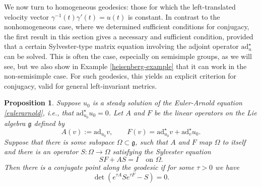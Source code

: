 \documentclass[oneside, 11pt]{amsart}
\newtheorem{proposition}[theorem]{Proposition}
\numberwithin{equation}{section}
\newcommand{\ad}{\mathrm{ad}}
\newcommand{\adstar}{\ad^{\star}}
\newcommand{\subby}{\Omega}
\newcommand{\Syl}{S}
\newcommand{\eulerop}{F}
\newcommand{\adop}{A}
\begin{document}
We now turn to homogeneous geodesics: those for which the left-translated velocity vector $\gamma^{-1}(t)\gamma'(t) = u(t)$ is constant. In contrast to the nonhomogeneous case, where we determined sufficient conditions for conjugacy, the first result in this section gives a necessary and sufficient condition, provided that a certain Sylvester-type matrix equation involving the adjoint operator $\adstar_u$ can be solved. This is often the case, especially on  
semisimple groups, as we will see, but we also show in Example \ref{heisenberg-example} that it can work in the non-semisimple case. For such geodesics, this yields an explicit criterion for conjugacy, valid for general left-invariant metrics.

\begin{proposition}\label{steadytheorem}
Suppose $u_0$ is a steady solution of the Euler-Arnold equation \eqref{eulerarnold}, i.e., that $\adstar_{u_0}u_0=0$. Let $\adop$ and $\eulerop$ be the linear operators on the Lie algebra $\mathfrak{g}$ defined by
\begin{equation}\label{jacobi_operators}
\adop(v) := \ad_{u_0}v, \qquad \eulerop(v) = \adstar_{u_0}v + \adstar_vu_0.
\end{equation}
Suppose that there is some subspace $\subby\subset \mathfrak{g}$, such that $\adop$ and $\eulerop$ map $\subby$ to itself and there is an operator $\Syl
\colon \subby\to\subby$ satisfying the Sylvester equation \begin{equation}\label{sylvestercondition}
    \Syl \eulerop+\adop \Syl=I \quad \text{on $\subby$.}
\end{equation}  
Then there is a conjugate point along the geodesic  
if for some $\tau > 0$ we have 
\begin{equation}\label{determinantcondition}
\det{(e^{\tau \adop}\Syl e^{\tau \eulerop}-\Syl)} = 0.
\end{equation}
\end{proposition}
\end{document}
